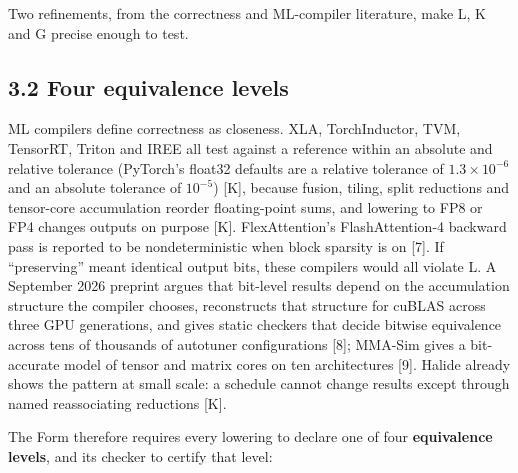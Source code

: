 \documentclass[10pt,letterpaper]{article}
\begin{document}
Two refinements, from the correctness and ML-compiler literature, make
L, K and G precise enough to test.

\subsection{3.2 Four equivalence levels}\label{four-equivalence-levels}

ML compilers define correctness as closeness. XLA, TorchInductor, TVM,
TensorRT, Triton and IREE all test against a reference within an
absolute and relative tolerance (PyTorch's float32 defaults are a
relative tolerance of \(1.3\times10^{-6}\) and an absolute tolerance of
\(10^{-5}\)) {[}K{]}, because fusion, tiling, split reductions and
tensor-core accumulation reorder floating-point sums, and lowering to
FP8 or FP4 changes outputs on purpose {[}K{]}. FlexAttention's
FlashAttention-4 backward pass is reported to be nondeterministic when
block sparsity is on {[}7{]}. If ``preserving'' meant identical output
bits, these compilers would all violate L. A September 2026 preprint
argues that bit-level results depend on the accumulation structure the
compiler chooses, reconstructs that structure for cuBLAS across three
GPU generations, and gives static checkers that decide bitwise
equivalence across tens of thousands of autotuner configurations
{[}8{]}; MMA-Sim gives a bit-accurate model of tensor and matrix cores
on ten architectures {[}9{]}. Halide already shows the pattern at small
scale: a schedule cannot change results except through named
reassociating reductions {[}K{]}.

The Form therefore requires every lowering to declare one of four
\textbf{equivalence levels}, and its checker to certify that level:
\end{document}
